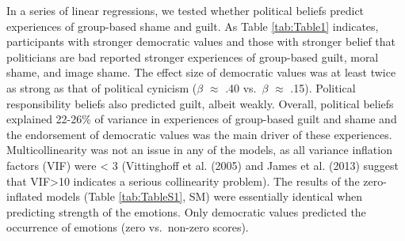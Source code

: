 \documentclass[
]{article}
\begin{document}
In a series of linear regressions, we tested whether political beliefs predict experiences of group-based shame and guilt. As Table \ref{tab:Table1} indicates, participants with stronger democratic values and those with stronger belief that politicians are bad reported stronger experiences of group-based guilt, moral shame, and image shame. The effect size of democratic values was at least twice as strong as that of political cynicism (\(\beta\) \(\approx\) .40 vs.~\(\beta\) \(\approx\) .15). Political responsibility beliefs also predicted guilt, albeit weakly. Overall, political beliefs explained 22-26\% of variance in experiences of group-based guilt and shame and the endorsement of democratic values was the main driver of these experiences. Multicollinearity was not an issue in any of the models, as all variance inflation factors (VIF) were \textless{} 3 (Vittinghoff et al. (2005) and James et al. (2013) suggest that VIF\textgreater10 indicates a serious collinearity problem). The results of the zero-inflated models (Table \ref{tab:TableS1}, SM) were essentially identical when predicting strength of the emotions. Only democratic values predicted the occurrence of emotions (zero vs.~non-zero scores).
\end{document}
